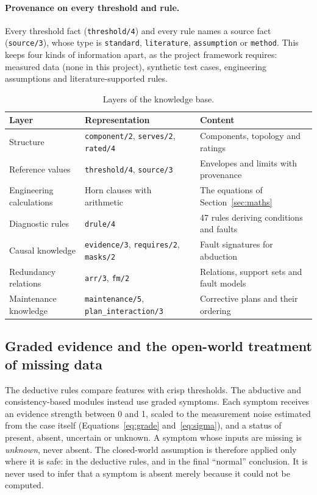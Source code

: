 \paragraph{Provenance on every threshold and rule.} Every threshold fact (\texttt{threshold/4}) and every rule names a source fact (\texttt{source/3}), whose type is \texttt{standard}, \texttt{literature}, \texttt{assumption} or \texttt{method}. This keeps four kinds of information apart, as the project framework requires: measured data (none in this project), synthetic test cases, engineering assumptions and literature-supported rules.

\begin{table}[htbp]
  \centering
  \small
  \caption{Layers of the knowledge base.}
  \label{tab:kr-layers}
  \begin{tabular}{L{3.4cm}L{4.6cm}L{6.0cm}}
    \toprule
    Layer & Representation & Content \\
    \midrule
    Structure & \texttt{component/2}, \texttt{serves/2}, \texttt{rated/4} & Components, topology and ratings \\
    Reference values & \texttt{threshold/4}, \texttt{source/3} & Envelopes and limits with provenance \\
    Engineering calculations & Horn clauses with arithmetic & The equations of Section~\ref{sec:maths} \\
    Diagnostic rules & \texttt{drule/4} & 47 rules deriving conditions and faults \\
    Causal knowledge & \texttt{evidence/3}, \texttt{requires/2}, \texttt{masks/2} & Fault signatures for abduction \\
    Redundancy relations & \texttt{arr/3}, \texttt{fm/2} & Relations, support sets and fault models \\
    Maintenance knowledge & \texttt{maintenance/5}, \texttt{plan\_interaction/3} & Corrective plans and their ordering \\
    \bottomrule
  \end{tabular}
\end{table}

\subsection{Graded evidence and the open-world treatment of missing data}

The deductive rules compare features with crisp thresholds. The abductive and consistency-based modules instead use graded symptoms. Each symptom receives an evidence strength between 0 and 1, scaled to the measurement noise estimated from the case itself (Equations~\eqref{eq:grade} and~\eqref{eq:sigma}), and a status of present, absent, uncertain or unknown. A symptom whose inputs are missing is \emph{unknown}, never absent. The closed-world assumption is therefore applied only where it is safe: in the deductive rules, and in the final ``normal'' conclusion. It is never used to infer that a symptom is absent merely because it could not be computed.


